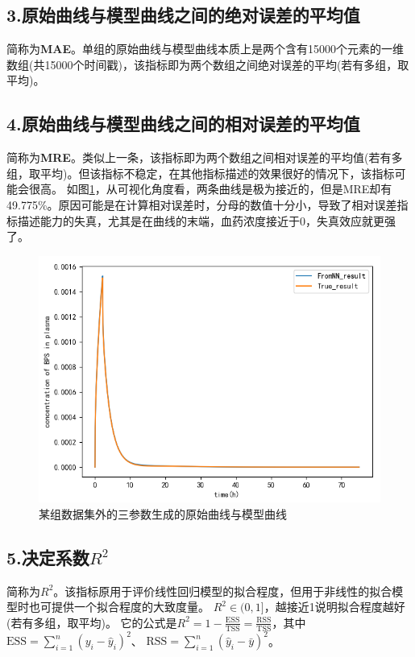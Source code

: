 \documentclass{article}
\begin{document}
\subsection*{3.原始曲线与模型曲线之间的绝对误差的平均值}
简称为\textbf{MAE}。单组的原始曲线与模型曲线本质上是两个含有15000个元素的一维数组(共15000个时间戳)，该指标即为两个数组之间绝对误差的平均(若有多组，取平均)。
\subsection*{4.原始曲线与模型曲线之间的相对误差的平均值}
简称为\textbf{MRE}。类似上一条，该指标即为两个数组之间相对误差的平均值(若有多组，取平均)。但该指标不稳定，在其他指标描述的效果很好的情况下，该指标可能会很高。
如图\ref{fig1}，从可视化角度看，两条曲线是极为接近的，但是MRE却有49.775\%。原因可能是在计算相对误差时，分母的数值十分小，导致了相对误差指标描述能力的失真，尤其是在曲线的末端，血药浓度接近于0，失真效应就更强了。
\begin{figure}[H]
    \centering
    \includegraphics[scale=0.4]{p1-1.png}
    \caption{某组数据集外的三参数生成的原始曲线与模型曲线}
    \label{fig1}
\end{figure}
\subsection*{5.决定系数$R^2$}
简称为\textbf{$R^2$}。该指标原用于评价线性回归模型的拟合程度，但用于非线性的拟合模型时也可提供一个拟合程度的大致度量。
$R^2\in(0,1]$，越接近1说明拟合程度越好(若有多组，取平均)。
它的公式是$ R^2 = 1 - \frac{\text{ESS}}{\text{TSS}} = \frac{\text{RSS}}{\text{TSS}}$，其中$\text{ESS} = \sum_{i=1}^{n} (y_i - \hat{y}_i)^2$、 
$ \text{RSS} = \sum_{i=1}^{n} (\hat{y}_i - \bar{y})^2 $。
\end{document}
